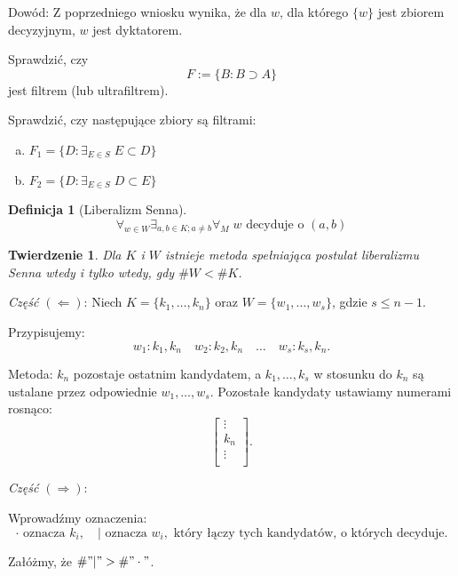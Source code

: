 \documentclass[12pt,a4paper]{article}
\theoremstyle{break}
\newtheorem{definition}{Definicja}[section]
\newtheorem{theorem}{Twierdzenie}[section]
\begin{document}
	Dowód: Z poprzedniego wniosku wynika, że dla $w$, dla którego $\{w\}$ jest zbiorem decyzyjnym, $w$ jest dyktatorem.
	\begin{zad}
		Sprawdzić, czy 
		\[
		F := \{B : B \supset A\}
		\]
		jest filtrem (lub ultrafiltrem).
	\end{zad}
	
	\begin{zad}
		Sprawdzić, czy następujące zbiory są filtrami:
		\begin{enumerate}[a)]
			\item $F_1 = \{D : \exists_{E \in S} \; E \subset D\}$
			\item $F_2 = \{D : \exists_{E \in S} \; D \subset E\}$
		\end{enumerate}
	\end{zad}
	
	\begin{definition}[Liberalizm Senna]
		\[
		\forall_{w \in W} \exists_{a, b \in K; a \neq b} \forall_M \; w \text{ decyduje o } (a, b)
		\]
	\end{definition}
	
	\begin{theorem}
		Dla $K$ i $W$ istnieje metoda spełniająca postulat liberalizmu Senna \textit{wtedy i tylko wtedy}, gdy $\# W < \# K$.
	\end{theorem}
	
	\textit{Część $(\Leftarrow)$}: Niech $K = \{k_1, \dots, k_n\}$ oraz $W = \{w_1, \dots, w_s\}$, gdzie $s \leq n - 1$. 
		
		Przypisujemy:
		\[
		w_1 : k_1, k_n \quad w_2 : k_2, k_n \quad \dots \quad w_s : k_s, k_n.
		\]
		
		Metoda: $k_n$ pozostaje ostatnim kandydatem, a $k_1, \dots, k_s$ w stosunku do $k_n$ są ustalane przez odpowiednie $w_1, \dots, w_s$. Pozostałe kandydaty ustawiamy numerami rosnąco:
		\[
		\begin{bmatrix}
			\vdots \\
			k_n \\
			\vdots \\
		\end{bmatrix}.
		\]
		
		\textit{Część $(\Rightarrow)$}: %
		
		Wprowadźmy oznaczenia:
		\[
		\cdot \text{ oznacza } k_i, \quad | \text{ oznacza } w_i, \text{ który łączy tych kandydatów, o których decyduje}.
		\]
		
		Załóżmy, że $\# "|" > \# "\cdot"$.
		
\end{document}
